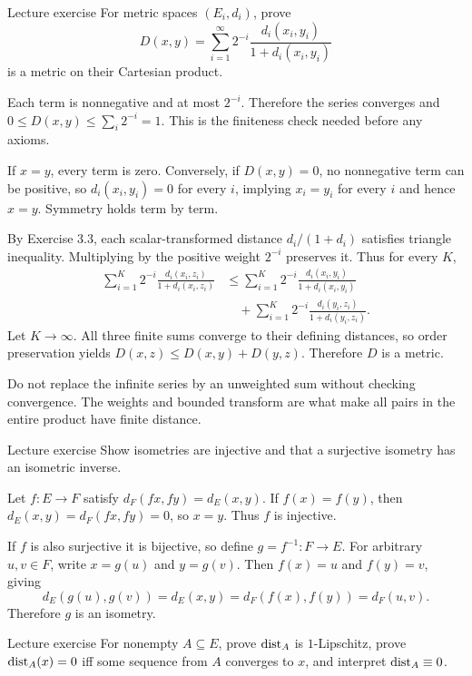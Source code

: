 \begin{exam}{Lecture exercise}
For metric spaces $(E_i,d_i)$, prove
\[D(x,y)=\sum_{i=1}^\infty2^{-i}\frac{d_i(x_i,y_i)}{1+d_i(x_i,y_i)}\]
is a metric on their Cartesian product.
\end{exam}
\begin{answer}
Each term is nonnegative and at most $2^{-i}$. Therefore the series converges and $0\le D(x,y)\le\sum_i2^{-i}=1$. This is the finiteness check needed before any axioms.

If $x=y$, every term is zero. Conversely, if $D(x,y)=0$, no nonnegative term can be positive, so $d_i(x_i,y_i)=0$ for every $i$, implying $x_i=y_i$ for every $i$ and hence $x=y$. Symmetry holds term by term.

By Exercise 3.3, each scalar-transformed distance $d_i/(1+d_i)$ satisfies triangle inequality. Multiplying by the positive weight $2^{-i}$ preserves it. Thus for every $K$,
\begin{align*}
\sum_{i=1}^K2^{-i}\frac{d_i(x_i,z_i)}{1+d_i(x_i,z_i)}
&\le\sum_{i=1}^K2^{-i}\frac{d_i(x_i,y_i)}{1+d_i(x_i,y_i)}\\
&\quad+\sum_{i=1}^K2^{-i}\frac{d_i(y_i,z_i)}{1+d_i(y_i,z_i)}.
\end{align*}
Let $K\to\infty$. All three finite sums converge to their defining distances, so order preservation yields $D(x,z)\le D(x,y)+D(y,z)$. Therefore $D$ is a metric.
\end{answer}
\begin{tip}
Do not replace the infinite series by an unweighted sum without checking convergence. The weights and bounded transform are what make all pairs in the entire product have finite distance.
\end{tip}
\begin{exam}{Lecture exercise}
Show isometries are injective and that a surjective isometry has an isometric inverse.
\end{exam}
\begin{answer}
Let $f:E\to F$ satisfy $d_F(fx,fy)=d_E(x,y)$. If $f(x)=f(y)$, then $d_E(x,y)=d_F(fx,fy)=0$, so $x=y$. Thus $f$ is injective.

If $f$ is also surjective it is bijective, so define $g=f^{-1}:F\to E$. For arbitrary $u,v\in F$, write $x=g(u)$ and $y=g(v)$. Then $f(x)=u$ and $f(y)=v$, giving
\[d_E(g(u),g(v))=d_E(x,y)=d_F(f(x),f(y))=d_F(u,v).\]
Therefore $g$ is an isometry.
\end{answer}
\begin{exam}{Lecture exercise}
For nonempty $A\subseteq E$, prove $\operatorname{dist}_A$ is $1$-Lipschitz, prove $\operatorname{dist}_A(x)=0$ iff some sequence from $A$ converges to $x$, and interpret $\operatorname{dist}_A\equiv0$.
\end{exam}
